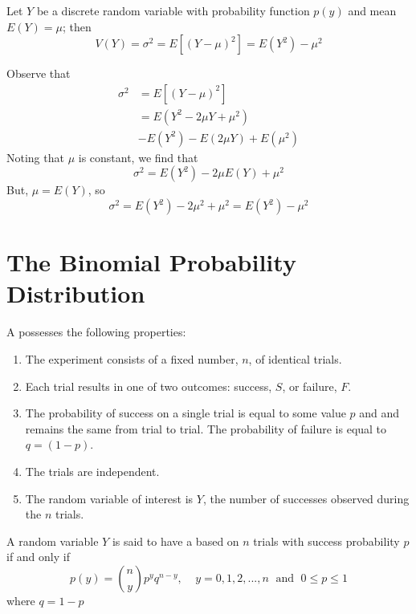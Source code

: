 \documentclass[12pt, a4paper, twoside, openright, titlepage]{book}
\begin{document}
\begin{thm}{}{}
    Let $Y$ be a discrete random variable with probability function $p(y)$ and mean $E(Y) = \mu$; then \begin{equation*}
        V(Y) = \sigma^2 = E[(Y-\mu)^2] = E(Y^2) - \mu^2
    \end{equation*}
\end{thm}
\begin{proof*}{}{}
    Observe that \begin{align*}
        \sigma^2 &= E[(Y-\mu)^2] \\
        &= E(Y^2-2\mu Y+\mu^2) \\
        &- E(Y^2) - E(2\mu Y) + E(\mu^2)
    \end{align*}
    Noting that $\mu$ is constant, we find that \begin{equation*}
        \sigma^2 = E(Y^2) - 2\mu E(Y) + \mu^2
    \end{equation*}
    But, $\mu = E(Y)$, so \begin{equation*}
        \sigma^2 = E(Y^2)-2\mu^2+\mu^2 = E(Y^2)-\mu^2
    \end{equation*}
\end{proof*}


\section{\textsection The Binomial Probability Distribution}

\begin{defn}{}{}
    A  possesses the following properties: \begin{enumerate}
        \item The experiment consists of a fixed number, $n$, of identical trials.
        \item Each trial results in one of two outcomes: success, $S$, or failure, $F$.
        \item The probability of success on a single trial is equal to some value $p$ and and remains the same from trial to trial. The probability of failure is equal to $q = (1-p)$.
        \item The trials are independent.
        \item The random variable of interest is $Y$, the number of successes observed during the $n$ trials.
    \end{enumerate}
\end{defn}

\begin{defn}{}{}
    A random variable $Y$ is said to have a  based on $n$ trials with success probability $p$ if and only if \begin{equation*}
        p(y) = \binom{n}{y}p^yq^{n-y},\;\;\;\; y =0,1,2,...,n\;\text{ and }\;0\leq p \leq 1
    \end{equation*}
    where $q = 1-p$
\end{defn}
\end{document}
